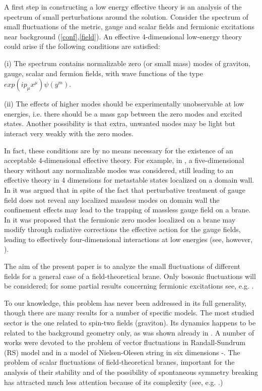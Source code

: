 \documentclass[a4paper,12pt]{article}
\begin{document}
A first step in constructing a low energy effective theory is an
analysis of the spectrum of small perturbations around the solution.
Consider the spectrum of small fluctuations of the metric, gauge and
scalar fields and fermionic excitations near background
(\ref{conf},\ref{field}). An effective 4-dimensional low-energy
theory could arise if the following conditions are satisfied:

(i) The spectrum contains normalizable zero (or small mass) modes of
graviton, gauge, scalar and fermion fields, with wave functions of
the type $exp(i p_\mu x^\mu) \psi(y^m)$.

(ii) The effects of higher modes should be experimentally
unobservable at low energies, i.e. there should be a mass gap between
the zero modes and excited states. Another possibility is that extra,
unwanted modes may be light but interact very weakly with the zero
modes.

In fact, these conditions are by no means necessary for the existence
of an acceptable 4-dimensional effective theory. For example, in
\cite{Dubovsky:2000am}, a five-dimensional theory without any
normalizable modes was considered, still leading to an effective
theory in 4 dimensions for metastable states localized on a domain
wall. In \cite{Dvali:1996xe,Dvali:1996bg} it was argued that in spite
of the fact that perturbative treatment of gauge field does not
reveal any localized massless modes on domain wall the confinement
effects may lead to the trapping of massless gauge field on a brane.
In \cite{Dvali:2000rx} it was proposed that the fermionic zero modes
localized on a brane may modify through radiative corrections the
effective action for the gauge fields, leading to effectively
four-dimensional interactions at low energies (see, however,
\cite{Dubovsky:2001pe}).

The aim of the present paper is to analyze the small fluctuations of
different fields for a general case of a field-theoretical brane.
Only bosonic fluctuations will be considered; for some partial
results concerning fermionic excitations see, e.g.
\cite{Randjbar-Daemi:2000cr}.

To our  knowledge, this problem has never been addressed in its full
generality, though there are many results for a number of specific
models. The most studied sector is the one related to spin-two fields
(graviton). Its dynamics happens to be related to the background
geometry only, as was shown already in \cite{Randall:1999vf}. A
number of works were devoted to the problem of vector fluctuations in
Randall-Sundrum (RS) model and in a model of Nielsen-Olesen string in
six dimensions \cite{Oda:2000zc}-\cite{Giovannini:2002jf}. The problem of scalar fluctuations of
field-theoretical branes, important for the analysis of their
stability and of the possibility of spontaneous symmetry breaking has
attracted much less attention because of its complexity (see, e.g.
\cite{Giovannini:2001fh}.)
\end{document}
